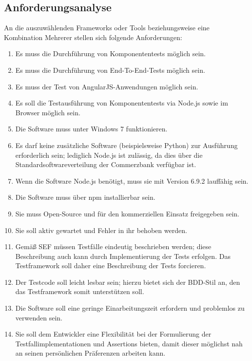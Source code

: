 \subsection{Anforderungsanalyse}
An die auszuwählenden Frameworks oder Tools beziehungsweise eine Kombination Mehrerer stellen sich folgende Anforderungen:
\begin{enumerate}
	\item Es muss die Durchführung von Komponententests möglich sein.
	\item Es muss die Durchführung von End-To-End-Tests möglich sein.
	\item Es muss der Test von AngularJS-Anwendungen möglich sein.
	\item Es soll die Testausführung von Komponententests via Node.js sowie im Browser möglich sein.
	\item Die Software muss unter Windows 7 funktionieren.
	\item Es darf keine zusätzliche Software (beispielsweise Python) zur Ausführung erforderlich sein; lediglich Node.js ist zulässig, da dies über die Standardsoftwareverteilung der Commerzbank verfügbar ist.
	\item Wenn die Software Node.js benötigt, muss sie mit Version 6.9.2 lauffähig sein.
	\item Die Software muss über npm installierbar sein.
	\item Sie muss Open-Source und für den kommerziellen Einsatz freigegeben sein.
	\item Sie soll aktiv gewartet und Fehler in ihr behoben werden.
	\item Gemäß SEF müssen Testfälle eindeutig beschrieben werden; diese Beschreibung auch kann durch Implementierung der Tests erfolgen\cite{coba-sef}. Das Testframework soll daher eine Beschreibung der Tests forcieren.
	\item Der Testcode soll leicht lesbar sein\cite[][7]{coba-programmierrichtlinienAllgemein}; hierzu bietet sich der BDD-Stil an, den das Testframework somit unterstützen soll.
	\item Die Software soll eine geringe Einarbeitungszeit erfordern und problemlos zu verwenden sein. 
	\item Sie soll dem Entwickler eine Flexibilität bei der Formulierung der Testfallimplementationen und Assertions bieten, damit dieser möglichst nah an seinen persönlichen Präferenzen arbeiten kann.

\end{enumerate}
